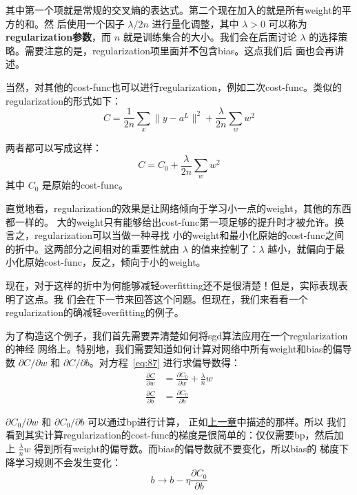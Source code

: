 其中第一个项就是常规的交叉熵的表达式。第二个现在加入的就是所有\gls*{weight}的平方的和。然
后使用一个因子 $\lambda / 2n$ 进行量化调整，其中 $\lambda > 0$ 可以称为\textbf{\gls*{regularization}参数}，而 $n$ 就是训练集合的大小。我们会在后面讨论
$\lambda$ 的选择策略。需要注意的是，\gls*{regularization}项里面并\textbf{不}包含\gls*{bias}。这点我们后
面也会再讲述。

当然，对其他的\gls*{cost-func}也可以进行\gls*{regularization}，例如二次\gls*{cost-func}。类似的\gls*{regularization}的形式如下：
\begin{equation}
  C = \frac{1}{2n} \sum_x \|y-a^L\|^2 + \frac{\lambda}{2n} \sum_w w^2
  \label{eq:86}\tag{86}
\end{equation}

两者都可以写成这样：
\begin{equation}
  C = C_0 + \frac{\lambda}{2n} \sum_w w^2
  \label{eq:87}\tag{87}
\end{equation}
其中 $C_0$ 是原始的\gls*{cost-func}。

直觉地看，\gls*{regularization}的效果是让网络倾向于学习小一点的\gls*{weight}，其他的东西都一样的。
大的\gls*{weight}只有能够给出\gls*{cost-func}第一项足够的提升时才被允许。换言之，\gls*{regularization}可以当做一种寻找
小的\gls*{weight}和最小化原始的\gls*{cost-func}之间的折中。这两部分之间相对的重要性就由 $\lambda$
的值来控制了：$\lambda$ 越小，就偏向于最小化原始\gls*{cost-func}，反之，倾向于小的\gls*{weight}。

现在，对于这样的折中为何能够减轻\gls*{overfitting}还不是很清楚！但是，实际表现表明了这点。我
们会在下一节来回答这个问题。但现在，我们来看看一个\gls*{regularization}的确减轻\gls*{overfitting}的例子。

为了构造这个例子，我们首先需要弄清楚如何将\gls*{sgd}算法应用在一个\gls*{regularization}的神经
网络上。特别地，我们需要知道如何计算对网络中所有\gls*{weight}和\gls*{bias}的偏导数 $\partial
C/\partial w$ 和 $\partial C/\partial b$。对方程~\eqref{eq:87} 进行求偏导数得：
\begin{align}
  \frac{\partial C}{\partial w} & = \frac{\partial C_0}{\partial w} +
                                  \frac{\lambda}{n} w \label{eq:88}\tag{88} \\
  \frac{\partial C}{\partial b} & = \frac{\partial C_0}{\partial b} \label{eq:89}\tag{89}
\end{align}

$\partial C_0/\partial w$ 和 $\partial C_0/\partial b$ 可以通过\gls*{bp}进行计算，
正如\hyperref[ch:HowTheBackpropagationAlgorithmWorks]{上一章}中描述的那样。所以
我们看到其实计算\gls*{regularization}的\gls*{cost-func}的梯度是很简单的：仅仅需要\gls*{bp}，然后加上
$\frac{\lambda}{n} w$ 得到所有\gls*{weight}的偏导数。而\gls*{bias}的偏导数就不要变化，所以\gls*{bias}的
梯度下降学习规则不会发生变化：
\begin{equation}
  b \rightarrow b -\eta \frac{\partial C_0}{\partial b}
  \label{eq:90}\tag{90}
\end{equation}

